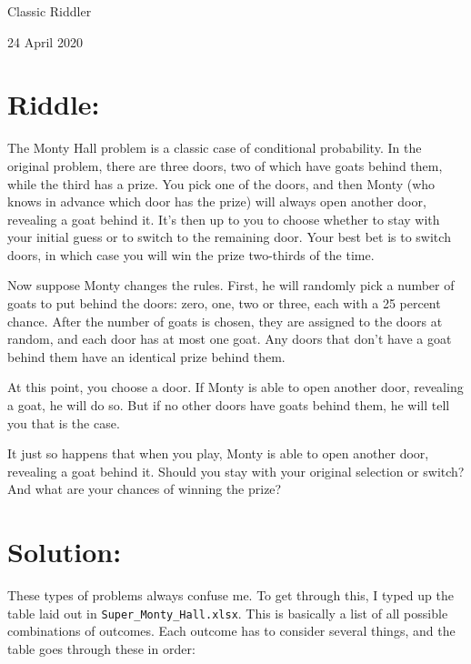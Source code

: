 \documentclass{article}
\begin{document}
\pagestyle{empty} %

\begin{center}
{\LARGE Classic Riddler}

\vspace{0.15in}

{\Large 24 April 2020}
\end{center}


\section*{Riddle:}

The Monty Hall problem is a classic case of conditional probability.
In the original problem, there are three doors, two of which have goats behind them, while the third has a prize.
You pick one of the doors, and then Monty (who knows in advance which door has the prize) will always open another door, revealing a goat behind it.
It’s then up to you to choose whether to stay with your initial guess or to switch to the remaining door.
Your best bet is to switch doors, in which case you will win the prize two-thirds of the time.

Now suppose Monty changes the rules.
First, he will randomly pick a number of goats to put behind the doors: zero, one, two or three, each with a 25 percent chance.
After the number of goats is chosen, they are assigned to the doors at random, and each door has at most one goat.
Any doors that don’t have a goat behind them have an identical prize behind them.

At this point, you choose a door.
If Monty is able to open another door, revealing a goat, he will do so.
But if no other doors have goats behind them, he will tell you that is the case.

It just so happens that when you play, Monty is able to open another door, revealing a goat behind it.
Should you stay with your original selection or switch?
And what are your chances of winning the prize?

\section*{Solution:}

These types of problems always confuse me.
To get through this, I typed up the table laid out in \texttt{Super\_Monty\_Hall.xlsx}.
This is basically a list of all possible combinations of outcomes.
Each outcome has to consider several things, and the table goes through these in order:
\end{document}
